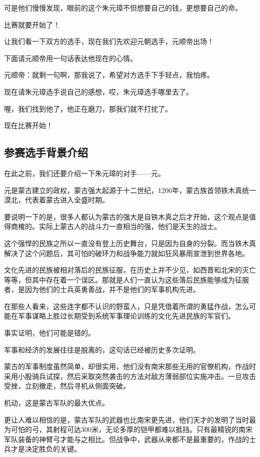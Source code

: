 \begin{multicols}{\theparacolNo}
		可是他们慢慢发现，眼前的这个朱元璋不但想要自己的钱，更想要自己的命。

		比赛就要开始了！

		让我们看一下双方的选手，现在我们先欢迎元朝选手，元顺帝出场！

		下面请元顺帝用一句话表达他现在的心情。

		元顺帝：就剩一句啊，那我说了，希望对方选手下手轻点，我怕疼。

		现在请朱元璋选手说自己的感想，哎，朱元璋选手哪里去了。

		喔，我们找到他了，他正在磨刀，那我们就不打扰了。

		现在比赛开始！

		\subsection{参赛选手背景介绍}
		在此之前，我们还要介绍一下朱元璋的对手——元。

		元是蒙古建立的政权，蒙古强大起源于十二世纪，1206年，蒙古族首领铁木真统一漠北，代表着蒙古进入全盛时期。

		要说明一下的是，很多人都认为蒙古的强大是自铁木真之后才开始，这个观点是值得商榷的。实际上蒙古人的战斗力一直相当的强，他们是天生的战士。

		这个强悍的民族之所以一直没有登上历史舞台，只是因为自身的分裂。而当铁木真解决了这个问题后，其可怕的破环力和战争能力就如狂风暴雨宣泄到世界各地。

		文化先进的民族被相对落后的民族征服，在历史上并不少见，如西晋和北宋的灭亡等等，但其中存在着一个误区。那就是人们一直认为这些落后民族能够成为征服者，是因为他们的士兵英勇善战，并不是他们的军事机构先进。

		在那些人看来，这些连字都不认识的野蛮人，只是凭借着所谓的勇猛作战，怎么可能在军事谋略上胜过长期受到系统军事理论训练的文化先进民族的军官们。

		事实证明，他们可能是错的。

		军事和经济的发展往往是脱离的，这句话已经被历史多次证明。

		蒙古的军事制度虽然简单，却很实用，他们没有南宋那些无用的官僚机构，作战时采用小股骑兵试探，然后采取突然袭击的方法对敌方薄弱部位实施冲击。一旦攻击受挫，立刻撤走，然后寻机从侧面突破。

		机动，这是蒙古军队的最大优点。

		更让人难以相信的是，蒙古军队的武器也比南宋更先进，他们天才的发明了当时最为可怕的弓，其射程可达300米，无论多厚的铠甲都难以抵挡。只有最精锐的南宋军队装备的神臂弓才能与之相比。但战争中，武器从来都不是最重要的，作战的士兵才是决定胜负的关键。


\end{multicols}
